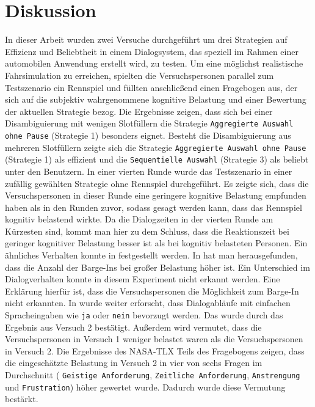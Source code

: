 \documentclass[12pt,a4paper]{scrartcl}
\begin{document}
\section{Diskussion}
\label{discussion}
In dieser Arbeit wurden zwei Versuche durchgeführt um drei Strategien auf Effizienz und Beliebtheit in einem Dialogsystem, das speziell im Rahmen einer automobilen Anwendung erstellt wird, zu testen. Um eine möglichst realistische Fahrsimulation zu erreichen, spielten die Versuchspersonen parallel zum Testszenario ein Rennspiel und füllten anschließend einen Fragebogen aus, der sich auf die subjektiv wahrgenommene kognitive Belastung und einer Bewertung der aktuellen Strategie bezog.
Die Ergebnisse zeigen, dass sich bei einer Disambiguierung mit wenigen Slotfüllern die Strategie \texttt{Aggregierte Auswahl ohne Pause} (Strategie 1) besonders eignet. Besteht die Disambiguierung aus mehreren Slotfüllern zeigte sich die Strategie \texttt{Aggregierte Auswahl ohne Pause} (Strategie 1) als effizient und die \texttt{Sequentielle Auswahl} (Strategie 3) als beliebt unter den Benutzern. \newline \newline
In einer vierten Runde wurde das Testszenario in einer zufällig gewählten Strategie ohne Rennspiel durchgeführt. Es zeigte sich, dass die Versuchspersonen in dieser Runde eine geringere kognitive Belastung empfunden haben als in den Runden zuvor, sodass gesagt werden kann, dass das Rennspiel kognitiv belastend wirkte. Da die Dialogzeiten in der vierten Runde am Kürzesten sind, kommt man hier zu dem Schluss, dass die Reaktionszeit bei geringer kognitiver Belastung besser ist als bei kognitiv belasteten Personen. Ein ähnliches Verhalten konnte in \cite{DbCL} festgestellt werden. In \cite{eCLDS} hat man herausgefunden, dass die Anzahl der Barge-Ins bei großer Belastung höher ist. Ein Unterschied im Dialogverhalten konnte in diesem Experiment nicht erkannt werden. Eine Erklärung hierfür ist, dass die Versuchspersonen die Möglichkeit zum Barge-In nicht erkannten. In \cite{eCLDS} wurde weiter erforscht, dass Dialogabläufe mit einfachen Spracheingaben wie \texttt{ja} oder \texttt{nein} bevorzugt werden. Das wurde durch das Ergebnis aus Versuch 2 bestätigt. Außerdem wird vermutet, dass die Versuchspersonen in Versuch 1 weniger belastet waren als die Versuchspersonen in Versuch 2. Die Ergebnisse des NASA-TLX Teils des Fragebogens zeigen, dass die eingeschätzte Belastung in Versuch 2 in vier von sechs Fragen im Durchschnitt ( \texttt{Geistige Anforderung}, \texttt{Zeitliche Anforderung}, \texttt{Anstrengung} und \texttt{Frustration}) höher gewertet wurde. Dadurch wurde diese Vermutung bestärkt. \newline \newline
\end{document}
